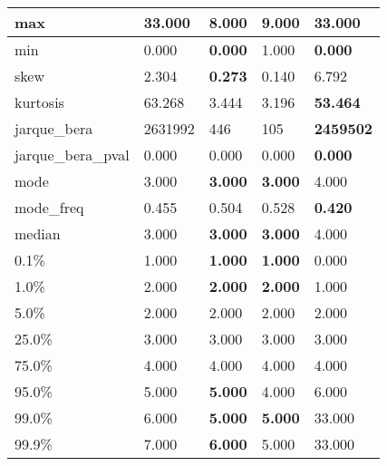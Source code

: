 \begin{table}[H]
\begin{tabular}{|l|m{10em}|m{10em}|m{10em}|m{10em}|}
\hline max & 33.000 & \cellcolor[rgb]{0.9, 0.54, 0.52} 8.000 & 9.000 & \bfseries 33.000 \\
\hline min & 0.000 & \bfseries 0.000 & \cellcolor[rgb]{0.9, 0.54, 0.52} 1.000 & \bfseries 0.000 \\
\hline skew & 2.304 & \bfseries 0.273 & 0.140 & \cellcolor[rgb]{0.9, 0.54, 0.52} 6.792 \\
\hline kurtosis & 63.268 & 3.444 & \cellcolor[rgb]{0.9, 0.54, 0.52} 3.196 & \bfseries 53.464 \\
\hline jarque\_bera & 2631992 & 446 & \cellcolor[rgb]{0.9, 0.54, 0.52} 105 & \bfseries 2459502 \\
\hline jarque\_bera\_pval & 0.000 & 0.000 & \cellcolor[rgb]{0.9, 0.54, 0.52} 0.000 & \bfseries 0.000 \\
\hline mode & 3.000 & \bfseries 3.000 & \bfseries 3.000 & \cellcolor[rgb]{0.9, 0.54, 0.52} 4.000 \\
\hline mode\_freq & 0.455 & 0.504 & \cellcolor[rgb]{0.9, 0.54, 0.52} 0.528 & \bfseries 0.420 \\
\hline median & 3.000 & \bfseries 3.000 & \bfseries 3.000 & \cellcolor[rgb]{0.9, 0.54, 0.52} 4.000 \\
\hline 0.1\% & 1.000 & \bfseries 1.000 & \bfseries 1.000 & \cellcolor[rgb]{0.9, 0.54, 0.52} 0.000 \\
\hline 1.0\% & 2.000 & \bfseries 2.000 & \bfseries 2.000 & \cellcolor[rgb]{0.9, 0.54, 0.52} 1.000 \\
\hline 5.0\% & 2.000 & 2.000 & 2.000 & 2.000 \\
\hline 25.0\% & 3.000 & 3.000 & 3.000 & 3.000 \\
\hline 75.0\% & 4.000 & 4.000 & 4.000 & 4.000 \\
\hline 95.0\% & 5.000 & \bfseries 5.000 & \cellcolor[rgb]{0.9, 0.54, 0.52} 4.000 & \cellcolor[rgb]{0.9, 0.54, 0.52} 6.000 \\
\hline 99.0\% & 6.000 & \bfseries 5.000 & \bfseries 5.000 & \cellcolor[rgb]{0.9, 0.54, 0.52} 33.000 \\
\hline 99.9\% & 7.000 & \bfseries 6.000 & 5.000 & \cellcolor[rgb]{0.9, 0.54, 0.52} 33.000 \\
\hline
\end{tabular}
\end{table}
